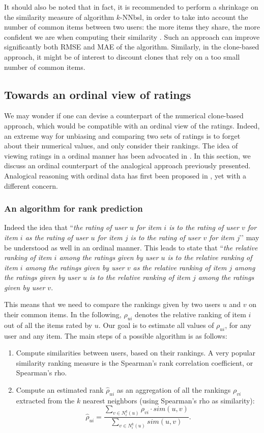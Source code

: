 It should also be noted that in fact, it is recommended to perform a shrinkage
on the similarity measure of algorithm $k$-NNbsl, in order to take into account
the number of common items between two users: the more items they share, the
more confident we are when computing their similarity \cite{KorACM2010}. Such
an approach can improve significantly both RMSE and MAE of the algorithm.
Similarly, in the clone-based approach, it might be of interest to discount
clones that rely on a too small number of common items.

\subsection{Towards an ordinal view of ratings}
\label{ORDINAL_POV}

We may wonder if one can devise a counterpart of the numerical clone-based
approach, which would be compatible with an ordinal view of the ratings.
Indeed, an extreme way for unbiasing and comparing two sets of ratings is to
forget about their numerical values, and only consider their rankings.  The
idea of viewing ratings in a ordinal manner has been advocated in
\cite{KorSillRECSYS11}.
In this section, we discuss an ordinal counterpart of the analogical approach
previously presented.  Analogical reasoning with ordinal data has first been
proposed in \cite{MicBarCAP09}, yet with a different concern.

\subsubsection{An algorithm for rank prediction}
Indeed the idea that ``\textit{the rating of user $u$ for item $i$ is to the
rating of user $v$ for item $i$ as the rating of user $u$ for item $j$ is to
the rating of user $v$ for item $j$}’’ may be understood  as well in an ordinal
manner. This leads to state that ``\textit{the relative ranking of item $i$
  among the ratings given by user $u$  is to the relative ranking of item $i$
  among the ratings given by user $v$ as the relative ranking of item $j$ among
  the ratings given by user $u$  is to the relative ranking of item $j$ among
the ratings given by user $v$}.

This means that we need to compare the rankings given by two users $u$ and $v$
on their common items. In the following, $\rho_{ui}$ denotes the relative
ranking of item $i$ out of all the items rated by $u$. Our goal is to estimate
all values of $\rho_{ui}$, for any user and any item. The main steps of a
possible algorithm is as follows:
\begin{enumerate}
  \item Compute similarities between users, based on their rankings. A very
    popular similarity ranking measure is the Spearman's rank correlation
    coefficient, or Spearman's rho.
  \item Compute an estimated rank $\hat{\rho}_{ui}$ as an aggregation of all the
    rankings $\rho_{vi}$ extracted from the $k$ nearest neighbors (using
    Spearman's rho as similarity):
    $$\hat{\rho}_{ui} = \frac{\sum_{v \in N_i^k(u)} \rho_{vi} \cdot
    sim(u, v)}{\sum_{v \in N_i^k(u)} sim(u, v)}.$$
\end{enumerate}

